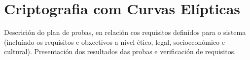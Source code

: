 \chapter{Criptografia com Curvas Elípticas}

Descrición do plan de probas, en relación cos requisitos definidos para o sistema (incluíndo os requisitos e obxectivos a nivel ético, legal, socioeconómico e cultural). Presentación dos resultados das probas e verificación de requisitos.